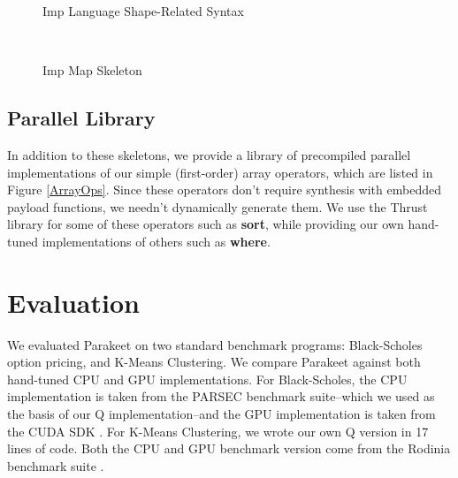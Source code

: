 \documentclass[preprint]{sigplanconf}
\begin{document}
\begin{figure}
\begin{tabular}{| m{0.1cm}m{1.2cm}m{0.1cm}m{0.2cm}p{2cm}p{2.4cm} |}
& & & & &\\
\hline
\end{tabular}
\caption{Imp Language Shape-Related Syntax}
\label{ImpSyntax}
\end{figure}

\begin{figure}[h!]
  \begin{lstlisting}[numbers=none]
    
  \end{lstlisting}
  \caption{Imp Map Skeleton}
  \label{ImpMap}
\end{figure}

\subsection{Parallel Library}

In addition to these skeletons, we provide a library of precompiled parallel
implementations of our simple (first-order) array operators, which are listed
in Figure \ref{ArrayOps}.  Since these operators don't require synthesis with
embedded payload functions, we needn't dynamically generate them.  We use the
Thrust library \cite{Hobe10} for some of these operators such as \textbf{sort},
while providing our own hand-tuned implementations of others such as
\textbf{where}.

\section{Evaluation}
\label{Evaluation}

We evaluated Parakeet on two standard benchmark programs: Black-Scholes option
pricing, and K-Means Clustering.  We compare Parakeet against both hand-tuned
CPU and GPU implementations.  For Black-Scholes, the CPU implementation is
taken from the PARSEC \cite{Bien08} benchmark suite--which we used as the basis
of our Q implementation--and the GPU implementation is taken from the CUDA SDK
\cite{NvidSD}.  For K-Means Clustering, we wrote our own Q version in 17 lines
of code.  Both the CPU and GPU benchmark version come from the Rodinia
benchmark suite \cite{Che09}.
\end{document}
